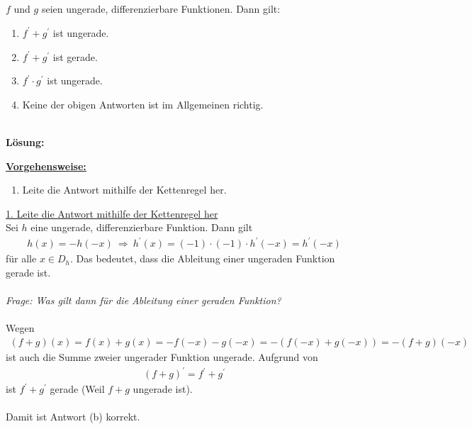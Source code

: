 \subsection*{}
$ f $ und $ g $ seien ungerade, differenzierbare Funktionen. Dann gilt:
\renewcommand{\labelenumi}{(\alph{enumi})}
\begin{enumerate}
	\item 
	$ f^\prime + g^\prime $ ist ungerade.
	\item
	$ f^\prime + g^\prime $ ist gerade.
	\item
	$ f^\prime \cdot g^\prime $ ist ungerade.
	\item
	Keine der obigen Antworten ist im Allgemeinen richtig.
\end{enumerate}
\ \\
\textbf{Lösung:}
\begin{mdframed}
\underline{\textbf{Vorgehensweise:}}
\renewcommand{\labelenumi}{\theenumi.}
\begin{enumerate}
\item Leite die Antwort mithilfe der Kettenregel her.
\end{enumerate}
\end{mdframed}

\underline{1. Leite die Antwort mithilfe der Kettenregel her}\\
Sei $ h  $ eine ungerade, differenzierbare Funktion.
Dann gilt
\begin{align*}
	h(x) = -h(-x)
	\ \Rightarrow \
	h^\prime (x) = (-1) \cdot (-1) \cdot h^\prime(-x) = h^\prime(-x)
\end{align*}
für alle $ x \in D_h $. Das bedeutet, dass die Ableitung einer ungeraden Funktion gerade ist.\\
\\
\textit{Frage: Was gilt dann für die Ableitung einer geraden Funktion?}\\
\\
Wegen 
\begin{align*}
	(f+g)(x) = f(x) +g(x) =-f(-x) - g(-x)
	=-(f(-x) + g(-x))= -(f+g)(-x)
\end{align*}
ist auch die Summe zweier ungerader Funktion ungerade. Aufgrund von 
\begin{align*}
	(f+g)^\prime = f^\prime + g^\prime
\end{align*}
ist $ f^\prime + g^\prime $ gerade (Weil $ f+g $ ungerade ist).\\
\\
Damit ist Antwort (b) korrekt.


